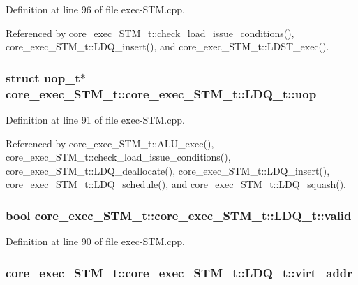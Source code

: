Definition at line 96 of file exec-STM.cpp.

Referenced by core\_\-exec\_\-STM\_\-t::check\_\-load\_\-issue\_\-conditions(), core\_\-exec\_\-STM\_\-t::LDQ\_\-insert(), and core\_\-exec\_\-STM\_\-t::LDST\_\-exec().
\subsubsection[{uop}]{\setlength{\rightskip}{0pt plus 5cm}struct {\bf uop\_\-t}$\ast$ core\_\-exec\_\-STM\_\-t::core\_\-exec\_\-STM\_\-t::LDQ\_\-t::uop\hspace{0.3cm}{\tt  [read]}}\label{structcore__exec__STM__t_1_1LDQ__t_dd284ae625c81a4955be8cffb1270081}




Definition at line 91 of file exec-STM.cpp.

Referenced by core\_\-exec\_\-STM\_\-t::ALU\_\-exec(), core\_\-exec\_\-STM\_\-t::check\_\-load\_\-issue\_\-conditions(), core\_\-exec\_\-STM\_\-t::LDQ\_\-deallocate(), core\_\-exec\_\-STM\_\-t::LDQ\_\-insert(), core\_\-exec\_\-STM\_\-t::LDQ\_\-schedule(), and core\_\-exec\_\-STM\_\-t::LDQ\_\-squash().
\subsubsection[{valid}]{\setlength{\rightskip}{0pt plus 5cm}bool core\_\-exec\_\-STM\_\-t::core\_\-exec\_\-STM\_\-t::LDQ\_\-t::valid}\label{structcore__exec__STM__t_1_1LDQ__t_fd452c99da279796b2473d591795817f}




Definition at line 90 of file exec-STM.cpp.
\subsubsection[{virt\_\-addr}]{ core\_\-exec\_\-STM\_\-t::core\_\-exec\_\-STM\_\-t::LDQ\_\-t::virt\_\-addr}\label{structcore__exec__STM__t_1_1LDQ__t_919534c6c35450d4c3e748c37c80c1ef}





